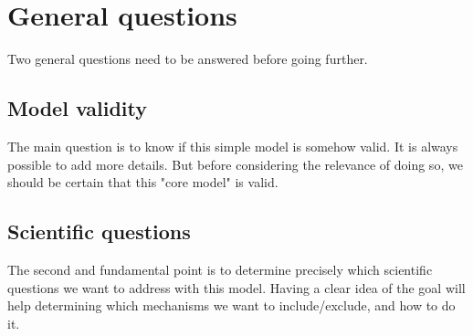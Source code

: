 \documentclass[12 pt]{article}
\begin{document}
\section{General questions}
Two general questions need to be answered before going further. \\
\subsection{Model validity}
The main question is to know if this simple model is somehow valid. It is always possible to add more details. But before considering the relevance of doing so, we should be certain that this "core model" is valid.
\subsection{Scientific questions}
The second and fundamental point is to determine precisely which scientific questions we want to address with this model. Having a clear idea of the goal will help determining which mechanisms we want to include/exclude, and how to do it.
\end{document}
